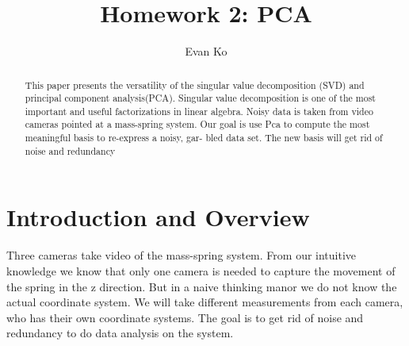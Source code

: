 \documentclass[]{article}
\title{Homework 2: PCA}
\author{Evan Ko}
\begin{document}
	\maketitle

\begin{abstract}
This paper presents the versatility of the singular value decomposition (SVD) and principal component analysis(PCA). Singular value decomposition is one of the most important and useful factorizations in linear algebra. Noisy data is taken from video cameras pointed at a mass-spring system. Our goal is use Pca to compute the most meaningful basis to re-express a noisy, gar-
bled data set. The new basis will get rid of noise and redundancy 
\end{abstract}

\section{Introduction and Overview}
Three cameras take video of the mass-spring system. From our intuitive knowledge we know that only one camera is needed to capture the movement of the spring in the z direction. But in a naive thinking manor we do not know the actual coordinate system. We will take different measurements from each camera, who has their own coordinate systems. The goal is to get rid of noise and redundancy to do data analysis on the system. 
\end{document}
